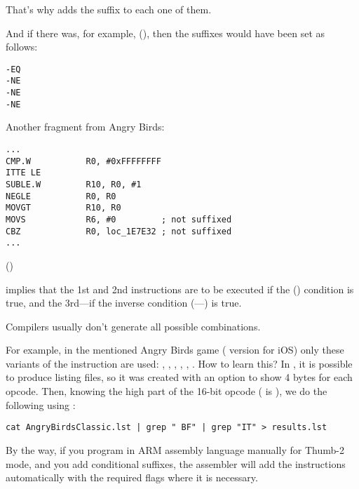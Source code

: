 That's why \IDA adds the  suffix to each one of them. 

And if there was, for example,  (), 
then the suffixes would have been set as follows:

\begin{lstlisting}
-EQ
-NE
-NE
-NE
\end{lstlisting}

Another fragment from Angry Birds:

\begin{lstlisting}[caption=Angry Birds Classic,style=customasmARM]
...
CMP.W           R0, #0xFFFFFFFF
ITTE LE
SUBLE.W         R10, R0, #1
NEGLE           R0, R0
MOVGT           R10, R0
MOVS            R6, #0         ; not suffixed
CBZ             R0, loc_1E7E32 ; not suffixed
...
\end{lstlisting}

 () 

implies that the 1st and 2nd instructions are to be executed if the  ()
condition is true, and the 3rd---if the inverse condition (---) 
is true.

Compilers usually don't generate all possible combinations.

For example, in the mentioned Angry Birds game ( version for iOS)
only these variants of the  instruction are used: 
, , , , , .
\myindex{\GrepUsage}
How to learn this?
In \IDA, it is possible to produce listing files, so it was created with an option to show 4 bytes for each opcode.
Then, knowing the high part of the 16-bit opcode ( is ), we do the following using :

\begin{lstlisting}
cat AngryBirdsClassic.lst | grep " BF" | grep "IT" > results.lst
\end{lstlisting}


By the way, if you program in ARM assembly language manually for Thumb-2 mode, 
and you add conditional suffixes,
the assembler will add the  instructions automatically with the required flags where it is necessary.

\myparagraph{\NonOptimizingXcodeIV (\ARMMode)}

